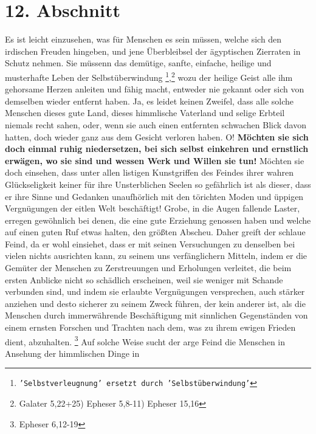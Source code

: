 {\section{12. Abschnitt} \label{kap17_ab12}

Es ist leicht einzusehen, was für Menschen es sein müssen, welche sich den
irdischen Freuden hingeben, und jene Überbleibsel der ägyptischen Zierraten in
Schutz nehmen. Sie müssenn das demütige, sanfte, einfache, heilige und
musterhafte Leben der Selbstüberwindung
\footnote{\texttt{'Selbstverleugnung' ersetzt durch
'Selbstüberwindung'}},\footnote{Galater 5,22+25) Epheser 5,8-11)
Epheser 15,16}
wozu der heilige Geist alle ihm gehorsame Herzen anleiten und fähig
macht, entweder nie gekannt oder sich von demselben wieder entfernt haben. Ja,
es leidet keinen Zweifel, dass alle solche Menschen dieses gute Land, dieses
himmlische Vaterland und selige Erbteil niemals recht sahen, oder, wenn sie auch
einen entfernten schwachen Blick davon hatten, doch wieder ganz aus dem Gesicht
verloren haben. O! \label{ref:17_12_einkehr}\textbf{Möchten sie sich doch einmal ruhig niedersetzen, bei sich
selbst
einkehren und ernstlich erwägen, wo sie sind und wessen Werk und Willen sie
tun!} Möchten sie doch einsehen, dass unter allen listigen Kunstgriffen des
Feindes ihrer wahren Glückseligkeit keiner für ihre Unsterblichen Seelen so
gefährlich ist als dieser, dass er ihre Sinne und Gedanken unaufhörlich mit den
törichten Moden und üppigen Vergnügungen der eitlen Welt beschäftigt! Grobe, in
die Augen fallende Laster, erregen gewöhnlich bei denen, die eine gute Erziehung
genossen haben und welche auf einen guten Ruf etwas halten, den größten
Abscheu. Daher greift der schlaue Feind, da er wohl einsiehet, dass er mit seinen
Versuchungen zu denselben bei vielen nichts ausrichten kann, zu seinem uns
verfänglichern Mitteln, indem er die Gemüter der Menschen zu Zerstreuungen und
Erholungen verleitet, die beim ersten Anblicke nicht so schädlich erscheinen,
weil sie weniger mit Schande verbunden sind, und indem sie erlaubte Vergnügungen
versprechen, auch stärker anziehen und desto sicherer zu seinem Zweck führen,
der kein anderer ist, als die Menschen durch immerwährende Beschäftigung mit
sinnlichen Gegenständen von einem ernsten Forschen und Trachten nach dem, was zu
ihrem ewigen Frieden dient, abzuhalten.
\footnote{Epheser 6,12-19}
Auf solche
Weise sucht der arge Feind die Menschen in Ansehung der himmlischen Dinge in
}
